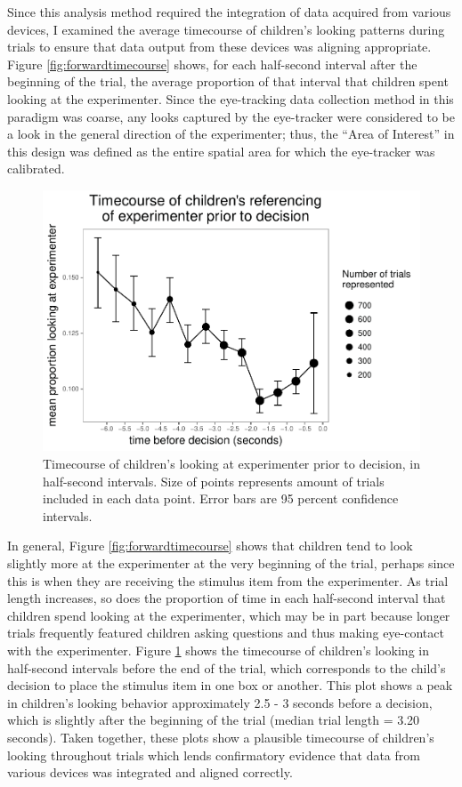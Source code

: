 \documentclass[floatsintext,man]{apa6}
\theoremstyle{definition}
\theoremstyle{definition}
\theoremstyle{definition}
\theoremstyle{remark}
\begin{document}
Since this analysis method required the integration of data acquired
from various devices, I examined the average timecourse of children's
looking patterns during trials to ensure that data output from these
devices was aligning appropriate. Figure \ref{fig:forwardtimecourse}
shows, for each half-second interval after the beginning of the trial,
the average proportion of that interval that children spent looking at
the experimenter. Since the eye-tracking data collection method in this
paradigm was coarse, any looks captured by the eye-tracker were
considered to be a look in the general direction of the experimenter;
thus, the \enquote{Area of Interest} in this design was defined as the
entire spatial area for which the eye-tracker was calibrated.

\begin{figure}
\centering
\includegraphics{soc_ref_category_paper_files/figure-latex/reversetimecourse-1.pdf}
\caption{\label{fig:reversetimecourse}Timecourse of children's looking at
experimenter prior to decision, in half-second intervals. Size of points
represents amount of trials included in each data point. Error bars are
95 percent confidence intervals.}
\end{figure}

In general, Figure \ref{fig:forwardtimecourse} shows that children tend
to look slightly more at the experimenter at the very beginning of the
trial, perhaps since this is when they are receiving the stimulus item
from the experimenter. As trial length increases, so does the proportion
of time in each half-second interval that children spend looking at the
experimenter, which may be in part because longer trials frequently
featured children asking questions and thus making eye-contact with the
experimenter. Figure \ref{fig:reversetimecourse} shows the timecourse of
children's looking in half-second intervals before the end of the trial,
which corresponds to the child's decision to place the stimulus item in
one box or another. This plot shows a peak in children's looking
behavior approximately 2.5 - 3 seconds before a decision, which is
slightly after the beginning of the trial (median trial length = 3.20
seconds). Taken together, these plots show a plausible timecourse of
children's looking throughout trials which lends confirmatory evidence
that data from various devices was integrated and aligned correctly.
\end{document}
